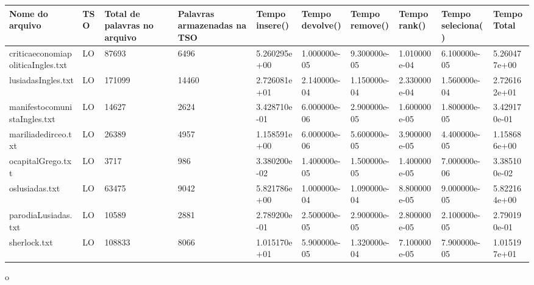 \begin{tabular}{|l|l|l|l|l|l|l|l|l|l|}
\hline
Nome do arquivo&TSO&Total de palavras no arquivo&Palavras armazenadas na TSO&Tempo insere()&Tempo devolve()&Tempo remove()&Tempo rank()&Tempo seleciona()&Tempo Total\\
\hline
criticaeconomiapoliticaIngles.txt&LO&87693&6496&5.260295e+00&1.000000e-05&9.300000e-05&1.010000e-04&6.100000e-05&5.260477e+00\\
\hline
lusiadasIngles.txt&LO&171099&14460&2.726081e+01&2.140000e-04&1.150000e-04&2.330000e-04&1.560000e-04&2.726162e+01\\
\hline
manifestocomunistaIngles.txt&LO&14627&2624&3.428710e-01&6.000000e-06&2.900000e-05&1.600000e-05&1.800000e-05&3.429170e-01\\
\hline
mariliadedirceo.txt&LO&26389&4957&1.158591e+00&6.000000e-06&5.600000e-05&3.900000e-05&4.400000e-05&1.158686e+00\\
\hline
ocapitalGrego.txt&LO&3717&986&3.380200e-02&1.400000e-05&1.500000e-05&1.400000e-05&7.000000e-06&3.385100e-02\\
\hline
oslusiadas.txt&LO&63475&9042&5.821786e+00&1.000000e-04&1.090000e-04&8.800000e-05&9.000000e-05&5.822164e+00\\
\hline
parodiaLusiadas.txt&LO&10589&2881&2.789200e-01&2.500000e-05&2.900000e-05&2.800000e-05&2.100000e-05&2.790190e-01\\
\hline
sherlock.txt&LO&108833&8066&1.015170e+01&5.900000e-05&1.320000e-04&7.100000e-05&7.900000e-05&1.015197e+01\\
\hline
\end{tabular}
o
